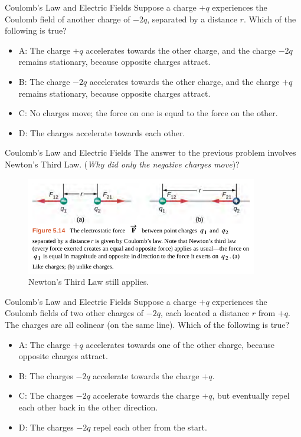 \documentclass{beamer}
\begin{document}
\begin{frame}{Coulomb’s Law and Electric Fields}
Suppose a charge $+q$ experiences the Coulomb field of another charge of $-2q$, separated by a distance $r$.  Which of the following is true?
\begin{itemize}
\item A: The charge $+q$ accelerates towards the other charge, and the charge $-2q$ remains stationary, because opposite charges attract.
\item B: The charge $-2q$ accelerates towards the other charge, and the charge $+q$ remains stationary, because opposite charges attract.
\item C: No charges move; the force on one is equal to the force on the other.
\item D: The charges accelerate towards each other.
\end{itemize}
\end{frame}

\begin{frame}{Coulomb’s Law and Electric Fields}
The answer to the previous problem involves Newton's Third Law.  (\textit{Why did only the negative charges move})?
\begin{figure}
\centering
\includegraphics[width=0.9\textwidth]{figures/third.png}
\caption{\label{fig:third} Newton's Third Law still applies.}
\end{figure}
\end{frame}

\begin{frame}{Coulomb’s Law and Electric Fields}
Suppose a charge $+q$ experiences the Coulomb fields of two other charges of $-2q$, each located a distance $r$ from $+q$.  The charges are all colinear (on the same line).  Which of the following is true?
\begin{itemize}
\item A: The charge $+q$ accelerates towards one of the other charge, because opposite charges attract.
\item B: The charges $-2q$ accelerate towards the charge $+q$.
\item C: The charges $-2q$ accelerate towards the charge $+q$, but eventually repel each other back in the other direction.
\item D: The charges $-2q$ repel each other from the start.
\end{itemize}
\end{frame}
\end{document}
